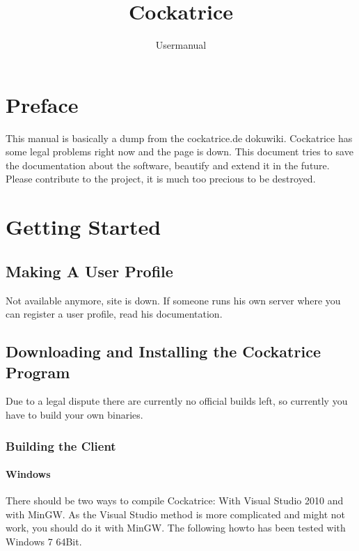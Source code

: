 \documentclass[a4paper]{scrbook}
\title{Cockatrice}
\subtitle{Usermanual}
\begin{document}
\maketitle
\tableofcontents

\chapter{Preface}
This manual is basically a dump from the cockatrice.de dokuwiki. Cockatrice has some legal problems right now and the page is down.
This document tries to save the documentation about the software, beautify and extend it in the future.
Please contribute to the project, it is much too precious to be destroyed.

\chapter{Getting Started}
\section{Making A User Profile}
Not available anymore, site is down. 
If someone runs his own server where you can register a user profile, read his documentation.

\section{Downloading and Installing the Cockatrice Program}
Due to a legal dispute there are currently no official builds left, so currently you have to build your own binaries.

\subsection{Building the Client}
\subsubsection{Windows}
There should be two ways to compile Cockatrice: With Visual Studio 2010 and with MinGW.
As the Visual Studio method is more complicated and might not work, you should do it with MinGW.
The following howto has been tested with Windows 7 64Bit.
\end{document}
